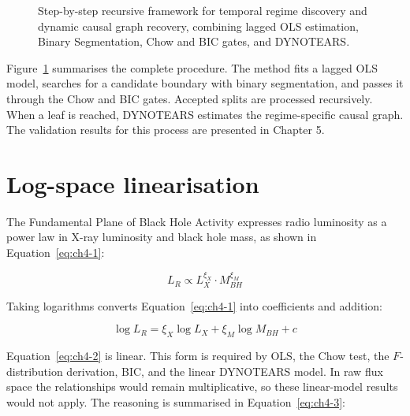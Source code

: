\begin{figure}[htbp]
{%
    }
    \caption{Step-by-step recursive framework for temporal regime discovery and dynamic causal graph recovery, combining lagged OLS estimation, Binary Segmentation, Chow and BIC gates, and DYNOTEARS.}
    \label{fig:pipeline}
\end{figure}

Figure~\ref{fig:pipeline} summarises the complete procedure. The method fits a
lagged OLS model, searches for a candidate boundary with binary segmentation, and
passes it through the Chow and BIC gates. Accepted splits are processed recursively.
When a leaf is reached, DYNOTEARS estimates the regime-specific causal graph. The
validation results for this process are presented in Chapter 5.

\section{Log-space linearisation}

The Fundamental Plane of Black Hole Activity expresses radio luminosity as a power law
in X-ray luminosity and black hole mass, as shown in Equation~\eqref{eq:ch4-1}:

\begin{equation}
    \label{eq:ch4-1}
L_R \propto L_X^{\xi_X} \cdot M_{BH}^{\xi_M}
\end{equation}

Taking logarithms converts Equation~\eqref{eq:ch4-1} into coefficients and addition:

\begin{equation}
    \label{eq:ch4-2}
\log L_R = \xi_X \log L_X + \xi_M \log M_{BH} + c
\end{equation}

Equation~\eqref{eq:ch4-2} is linear. This form is required by OLS, the Chow test,
the $F$-distribution derivation, BIC, and the linear DYNOTEARS model. In raw flux
space the relationships would remain multiplicative, so these linear-model results
would not apply. The reasoning is summarised in Equation~\eqref{eq:ch4-3}:

